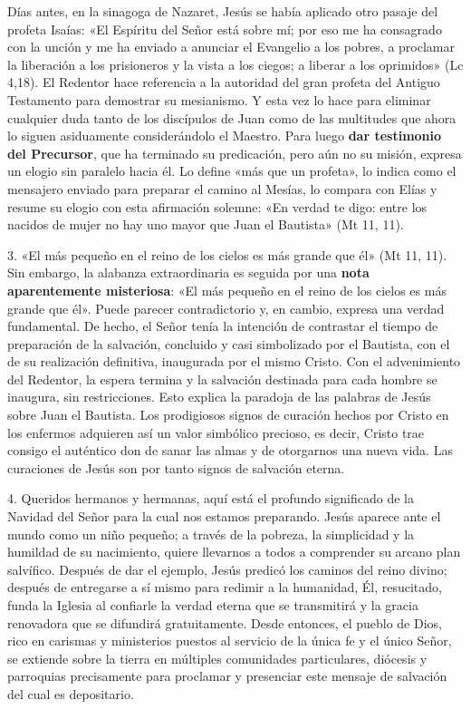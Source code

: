 \documentclass[]{article}
\begin{document}
Días antes, en la sinagoga de Nazaret, Jesús se había aplicado otro
pasaje del profeta Isaías: «El Espíritu del Señor está sobre mí; por eso
me ha consagrado con la unción y me ha enviado a anunciar el Evangelio a
los pobres, a proclamar la liberación a los prisioneros y la vista a los
ciegos; a liberar a los oprimidos» (Lc 4,18). El Redentor hace
referencia a la autoridad del gran profeta del Antiguo Testamento para
demostrar su mesianismo. Y esta vez lo hace para eliminar cualquier duda
tanto de los discípulos de Juan como de las multitudes que ahora lo
siguen asiduamente considerándolo el Maestro. Para luego \textbf{dar
testimonio del Precursor}, que ha terminado su predicación, pero aún no
su misión, expresa un elogio sin paralelo hacia él. Lo define «más que
un profeta», lo indica como el mensajero enviado para preparar el camino
al Mesías, lo compara con Elías y resume su elogio con esta afirmación
solemne: «En verdad te digo: entre los nacidos de mujer no hay uno mayor
que Juan el Bautista» (Mt 11, 11).

3. «El más pequeño en el reino de los cielos es más grande que él» (Mt
11, 11). Sin embargo, la alabanza extraordinaria es seguida por una
\textbf{nota aparentemente misteriosa}: «El más pequeño en el reino de
los cielos es más grande que él». Puede parecer contradictorio y, en
cambio, expresa una verdad fundamental. De hecho, el Señor tenía la
intención de contrastar el tiempo de preparación de la salvación,
concluido y casi simbolizado por el Bautista, con el de su realización
definitiva, inaugurada por el mismo Cristo. Con el advenimiento del
Redentor, la espera termina y la salvación destinada para cada hombre se
inaugura, sin restricciones. Esto explica la paradoja de las palabras de
Jesús sobre Juan el Bautista. Los prodigiosos signos de curación hechos
por Cristo en los enfermos adquieren así un valor simbólico precioso, es
decir, Cristo trae consigo el auténtico don de sanar las almas y de
otorgarnos una nueva vida. Las curaciones de Jesús son por tanto signos
de salvación eterna.

4. Queridos hermanos y hermanas, aquí está el profundo significado de la
Navidad del Señor para la cual nos estamos preparando. Jesús aparece
ante el mundo como un niño pequeño; a través de la pobreza, la
simplicidad y la humildad de su nacimiento, quiere llevarnos a todos a
comprender su arcano plan salvífico. Después de dar el ejemplo, Jesús
predicó los caminos del reino divino; después de entregarse a sí mismo
para redimir a la humanidad, Él, resucitado, funda la Iglesia al
confiarle la verdad eterna que se transmitirá y la gracia renovadora que
se difundirá gratuitamente. Desde entonces, el pueblo de Dios, rico en
carismas y ministerios puestos al servicio de la única fe y el único
Señor, se extiende sobre la tierra en múltiples comunidades
particulares, diócesis y parroquias precisamente para proclamar y
presenciar este mensaje de salvación del cual es depositario.
\end{document}
